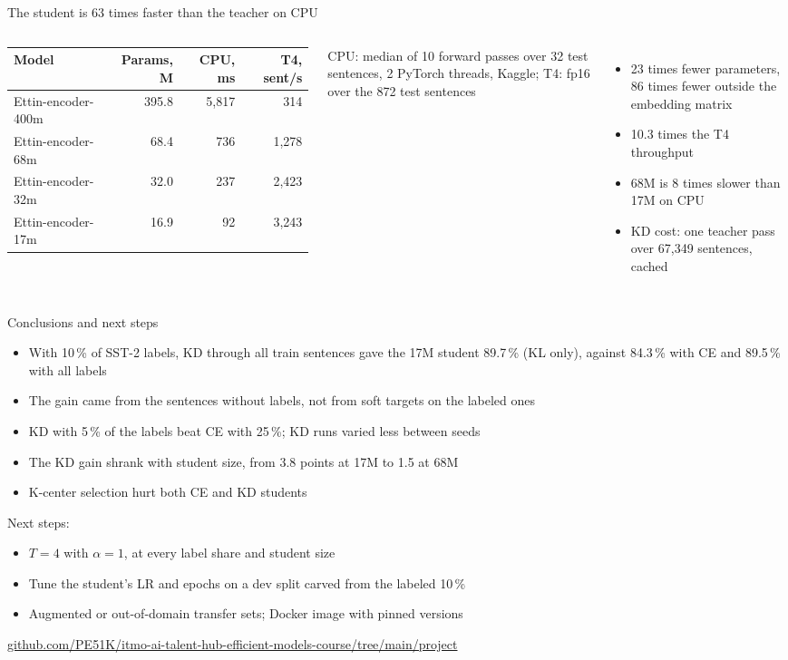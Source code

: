 \documentclass[aspectratio=169,11pt]{beamer}
\begin{document}
\begin{frame}{The student is 63 times faster than the teacher on CPU}
  \begin{columns}[T]
    \footnotesize
    \begin{tabular}{lrrr}
      \toprule
      Model & Params, M & CPU, ms & T4, sent/s \\
      \midrule
      Ettin-encoder-400m & 395.8 & 5,817 & 314 \\
      Ettin-encoder-68m & 68.4 & 736 & 1,278 \\
      Ettin-encoder-32m & 32.0 & 237 & 2,423 \\
      Ettin-encoder-17m & 16.9 & 92 & 3,243 \\
      \bottomrule
    \end{tabular}

    \footnotesize CPU: median of 10 forward passes over 32 test sentences, 2 PyTorch threads, Kaggle; T4: fp16 over the 872 test sentences
    \begin{itemize}
      \item 23 times fewer parameters, 86 times fewer outside the embedding matrix
      \item 10.3 times the T4 throughput
      \item 68M is 8 times slower than 17M on CPU
      \item KD cost: one teacher pass over 67,349 sentences, cached
    \end{itemize}
  \end{columns}
\end{frame}

\begin{frame}{Conclusions and next steps}
  \begin{itemize}
    \item With 10\,\% of SST-2 labels, KD through all train sentences gave the 17M student 89.7\,\% (KL only), against 84.3\,\% with CE and 89.5\,\% with all labels
    \item The gain came from the sentences without labels, not from soft targets on the labeled ones
    \item KD with 5\,\% of the labels beat CE with 25\,\%; KD runs varied less between seeds
    \item The KD gain shrank with student size, from 3.8 points at 17M to 1.5 at 68M
    \item K-center selection hurt both CE and KD students
  \end{itemize}
  \medskip
  Next steps:
  \begin{itemize}
    \item $T = 4$ with $\alpha = 1$, at every label share and student size
    \item Tune the student's LR and epochs on a dev split carved from the labeled 10\,\%
    \item Augmented or out-of-domain transfer sets; Docker image with pinned versions
  \end{itemize}
  \medskip
  \footnotesize \url{github.com/PE51K/itmo-ai-talent-hub-efficient-models-course/tree/main/project}
\end{frame}
\end{document}
